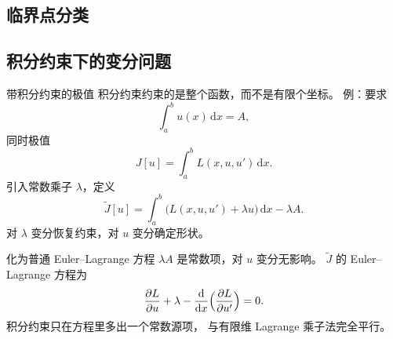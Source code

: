 \documentclass[fontset=windows, chinese, 10pt, xcolor=dvipsnames]{beamer}
\begin{document}
\subsection{临界点分类}

%
%

\subsection{积分约束下的变分问题}

\begin{frame}{带积分约束的极值}
  积分约束约束的是整个函数，而不是有限个坐标。
  例：要求
  \[
    \int_a^b u(x)\,\mathrm{d}x = A,
  \]
  同时极值
  \[
    J[u] = \int_a^b L(x,u,u')\,\mathrm{d}x.
  \]
  引入常数乘子 $\lambda$，定义
  \[
    \widetilde J[u] = \int_a^b
      \bigl(L(x,u,u') + \lambda u\bigr)\,\mathrm{d}x - \lambda A.
  \]
  对 $\lambda$ 变分恢复约束，对 $u$ 变分确定形状。
\end{frame}

\begin{frame}{化为普通 Euler--Lagrange 方程}
  $\lambda A$ 是常数项，对 $u$ 变分无影响。
  $\widetilde J$ 的 Euler--Lagrange 方程为
  \begin{equation*}
    \frac{\partial L}{\partial u} + \lambda
    - \frac{\mathrm{d}}{\mathrm{d}x}
      \Bigl(\frac{\partial L}{\partial u'}\Bigr) = 0.
  \end{equation*}
  积分约束只在方程里多出一个常数源项，
  与有限维 Lagrange 乘子法完全平行。
\end{frame}
\end{document}
